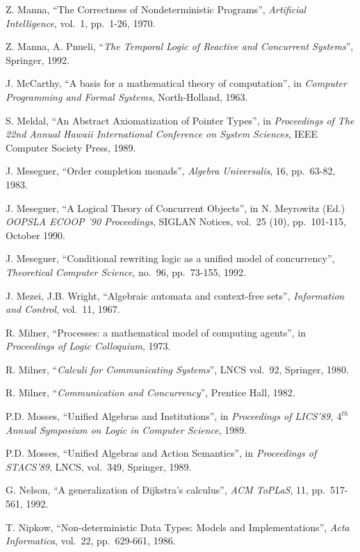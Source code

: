  Z. Manna, ``The Correctness of Nondeterministic 
Programs'', {\em Artificial Intelligence}, vol.~1, pp.~1-26, 1970.

 Z. Manna, A. Pnueli, ``{\em The Temporal Logic of 
Reactive and Concurrent Systems}'', Springer, 1992.

 J. McCarthy, ``A basis for a mathematical theory of 
computation'', in {\em Computer Programming and Formal Systems}, 
North-Holland, 1963.

 S. Meldal, ``An Abstract Axiomatization of Pointer 
Types'', in {\em Proceedings of The 22nd Annual Hawaii International 
Conference on System Sciences}, IEEE Computer Society Press, 1989.

 J. Meseguer, ``Order completion monads'', {\em Algebra 
Universalis}, 16, pp.~63-82, 1983.

 J. Meseguer, ``A Logical Theory of Concurrent Objects'', 
in N. Meyrowitz (Ed.) {\em OOPSLA ECOOP '90 Proceedings\/}, SIGLAN Notices, 
vol.~25 (10), pp.~101-115, October 1990. 

 J. Meseguer, ``Conditional rewriting logic as a unified 
model of concurrency'', {\em Theoretical Computer Science}, no.~96, 
pp.~73-155, 1992.

 J. Mezei, J.B. Wright, ``Algebraic automata and 
context-free sets'', {\em Information and Control}, vol.~11, 1967.

 R. Milner, ``Processes: a mathematical model of 
computing agents'', in {\em Proceedings of Logic Colloquium}, 1973.

 R. Milner, ``{\em Calculi for Communicating Systems}'', 
LNCS vol.~92, Springer, 1980.

 R. Milner, ``{\em Communication and Concurrency}'', Prentice Hall, 1982.

 P.D. Mosses, ``Unified Algebras and Institutions'', in 
{\em Proceedings of LICS'89, $4^{th}$ Annual Symposium on Logic in Computer 
Science}, 1989.

 P.D. Mosses, ``Unified Algebras and Action Semantics'', 
in {\em Proceedings of STACS'89}, LNCS, vol.~349, Springer, 1989.

 G. Nelson, ``A generalization of Dijkstra's 
calculus'', {\em ACM ToPLaS}, 11, pp.~517-561, 1992.

 T. Nipkow, ``Non-deterministic Data Types: Models and 
Implementations'', {\em Acta Informatica}, vol.~22, pp.~629-661, 1986.

